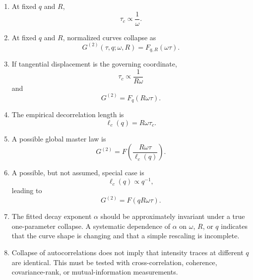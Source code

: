 \documentclass[11pt,letterpaper]{article}
\newcommand{\Gnorm}{G^{(2)}}
\begin{document}
\begin{enumerate}[leftmargin=2em]
    \item At fixed $q$ and $R$,
    \begin{equation}
        \tau_c\propto\frac{1}{\omega}.
    \end{equation}

    \item At fixed $q$ and $R$, normalized curves collapse as
    \begin{equation}
        \Gnorm(\tau,q;\omega,R)
        =
        F_{q,R}(\omega\tau).
    \end{equation}

    \item If tangential displacement is the governing coordinate,
    \begin{equation}
        \tau_c\propto\frac{1}{R\omega}
    \end{equation}
    and
    \begin{equation}
        \Gnorm
        =
        F_q(R\omega\tau).
    \end{equation}

    \item The empirical decorrelation length is
    \begin{equation}
        \ell_c(q)=R\omega\tau_c.
    \end{equation}

    \item A possible global master law is
    \begin{equation}
        \Gnorm
        =
        F\left(
        \frac{R\omega\tau}{\ell_c(q)}
        \right).
    \end{equation}

    \item A possible, but not assumed, special case is
    \begin{equation}
        \ell_c(q)\propto q^{-1},
    \end{equation}
    leading to
    \begin{equation}
        \Gnorm=F(qR\omega\tau).
    \end{equation}

    \item The fitted decay exponent $\alpha$ should be approximately
    invariant under a true one-parameter collapse. A systematic dependence
    of $\alpha$ on $\omega$, $R$, or $q$ indicates that the curve shape is
    changing and that a simple rescaling is incomplete.

    \item Collapse of autocorrelations does not imply that intensity traces
    at different $q$ are identical. This must be tested with cross-correlation,
    coherence, covariance-rank, or mutual-information measurements.
\end{enumerate}
\end{document}
